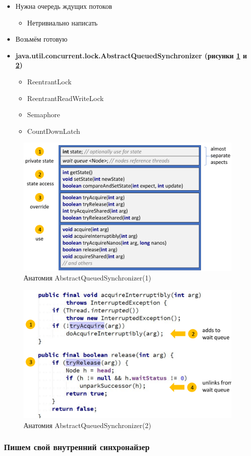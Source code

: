 \documentclass[10pt,a4paper,oneside,titlepage]{article}
\theoremstyle{plain}
\theoremstyle{defenition}
\begin{document}
\begin{itemize}
	\item Нужна очередь ждущих потоков
	\begin{itemize}
		\item Нетривиально написать
	\end{itemize}
    \item Возьмём готовую
    \item {\bfseries java.util.concurrent.lock.AbstractQueuedSynchronizer (рисунки \ref{fig:abstractqueuedsynchronizer1} и \ref{fig:abstractqueuedsynchronizer2})
    \begin{itemize}
    	\item ReentrantLock
    	\item ReentrantReadWriteLock
    	\item Semaphore
    	\item CountDownLatch
    \end{itemize}
}
\end{itemize}

\begin{figure}[h!]
	\centering
	\includegraphics[width=0.5\linewidth]{pictures/AbstractQueuedSynchronizer1}
	\caption{Анатомия AbstractQueuedSynchronizer(1)}
	\label{fig:abstractqueuedsynchronizer1}
\end{figure}

\begin{figure}[h!]
	\centering
	\includegraphics[width=0.5\linewidth]{pictures/AbstractQueuedSynchronizer2}
	\caption{Анатомия AbstractQueuedSynchronizer(2)}
	\label{fig:abstractqueuedsynchronizer2}
\end{figure}

\subsubsection{Пишем свой внутренний синхронайзер}
\end{document}

